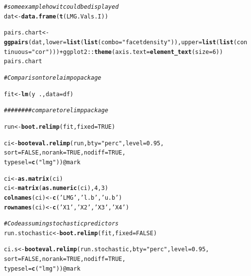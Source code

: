 \documentclass[11pt,a4paper,twoside]{book}\usepackage[]{graphicx}\usepackage[]{color}
\makeatletter
\newcommand{\hlnum}[1]{\textcolor[rgb]{0.686,0.059,0.569}{#1}}%
\newcommand{\hlstr}[1]{\textcolor[rgb]{0.192,0.494,0.8}{#1}}%
\newcommand{\hlcom}[1]{\textcolor[rgb]{0.678,0.584,0.686}{\textit{#1}}}%
\newcommand{\hlopt}[1]{\textcolor[rgb]{0,0,0}{#1}}%
\newcommand{\hlstd}[1]{\textcolor[rgb]{0.345,0.345,0.345}{#1}}%
\newcommand{\hlkwb}[1]{\textcolor[rgb]{0.69,0.353,0.396}{#1}}%
\newcommand{\hlkwc}[1]{\textcolor[rgb]{0.333,0.667,0.333}{#1}}%
\newcommand{\hlkwd}[1]{\textcolor[rgb]{0.737,0.353,0.396}{\textbf{#1}}}%
\newenvironment{kframe}{%
 \def\at@end@of@kframe{}%
 \ifinner\ifhmode%
  \def\at@end@of@kframe{\end{minipage}}%
  \begin{minipage}{\columnwidth}%
 \fi\fi%
 \def\FrameCommand##1{\hskip\@totalleftmargin \hskip-\fboxsep
 \colorbox{shadecolor}{##1}\hskip-\fboxsep
     \hskip-\linewidth \hskip-\@totalleftmargin \hskip\columnwidth}%
 \MakeFramed {\advance\hsize-\width
   \@totalleftmargin\z@ \linewidth\hsize
   \@setminipage}}%
 {\par\unskip\endMakeFramed%
 \at@end@of@kframe}
\newenvironment{knitrout}{}{} %
\makeatother
\begin{document}
\begin{knitrout}
\begin{kframe}
\begin{alltt}
\hlcom{# some example how it could be displayed}
\hlstd{dat} \hlkwb{<-} \hlkwd{data.frame}\hlstd{(}\hlkwd{t}\hlstd{(LMG.Vals.I))}

\hlstd{pairs.chart} \hlkwb{<-} \hlkwd{ggpairs}\hlstd{(dat,} \hlkwc{lower} \hlstd{=} \hlkwd{list}\hlstd{(}\hlkwd{list}\hlstd{(}\hlkwc{combo} \hlstd{=} \hlstr{"facetdensity"}\hlstd{)),} \hlkwc{upper} \hlstd{=} \hlkwd{list}\hlstd{(}\hlkwd{list}\hlstd{(}\hlkwc{continuous} \hlstd{=} \hlstr{"cor"}\hlstd{)))} \hlopt{+} \hlstd{ggplot2}\hlopt{::}\hlkwd{theme}\hlstd{(}\hlkwc{axis.text} \hlstd{=} \hlkwd{element_text}\hlstd{(}\hlkwc{size} \hlstd{=} \hlnum{6}\hlstd{))}
\hlstd{pairs.chart}



\hlcom{# Comparison to relaimpo package}

\hlstd{fit} \hlkwb{<-} \hlkwd{lm}\hlstd{(y}\hlopt{~}\hlstd{.,} \hlkwc{data}\hlstd{=df)}

\hlcom{######## compare to relimp package}

\hlstd{run}\hlkwb{<-}\hlkwd{boot.relimp}\hlstd{(fit,} \hlkwc{fixed}\hlstd{=}\hlnum{TRUE}\hlstd{)}

\hlstd{ci} \hlkwb{<-} \hlkwd{booteval.relimp}\hlstd{(run,} \hlkwc{bty} \hlstd{=} \hlstr{"perc"}\hlstd{,} \hlkwc{level} \hlstd{=} \hlnum{0.95}\hlstd{,}
                \hlkwc{sort} \hlstd{=} \hlnum{FALSE}\hlstd{,} \hlkwc{norank} \hlstd{=} \hlnum{TRUE}\hlstd{,} \hlkwc{nodiff} \hlstd{=} \hlnum{TRUE}\hlstd{,}
                \hlkwc{typesel} \hlstd{=} \hlkwd{c}\hlstd{(}\hlstr{"lmg"}\hlstd{))}\hlopt{@}\hlkwc{mark}

\hlstd{ci} \hlkwb{<-} \hlkwd{as.matrix}\hlstd{(ci)}
\hlstd{ci} \hlkwb{<-} \hlkwd{matrix}\hlstd{(}\hlkwd{as.numeric}\hlstd{(ci),} \hlnum{4} \hlstd{,} \hlnum{3}\hlstd{)}
\hlkwd{colnames}\hlstd{(ci)} \hlkwb{<-} \hlkwd{c}\hlstd{(}\hlstr{'LMG'}\hlstd{,} \hlstr{'l.b'}\hlstd{,} \hlstr{'u.b'}\hlstd{)}
\hlkwd{rownames}\hlstd{(ci)} \hlkwb{<-} \hlkwd{c}\hlstd{(}\hlstr{'X1'}\hlstd{,} \hlstr{'X2'}\hlstd{,} \hlstr{'X3'}\hlstd{,} \hlstr{'X4'}\hlstd{)}

\hlcom{#Code assuming stochastic predictors}
\hlstd{run.stochastic}\hlkwb{<-}\hlkwd{boot.relimp}\hlstd{(fit,} \hlkwc{fixed}\hlstd{=}\hlnum{FALSE}\hlstd{)}

\hlstd{ci.s} \hlkwb{<-} \hlkwd{booteval.relimp}\hlstd{(run.stochastic,} \hlkwc{bty} \hlstd{=} \hlstr{"perc"}\hlstd{,} \hlkwc{level} \hlstd{=} \hlnum{0.95}\hlstd{,}
                \hlkwc{sort} \hlstd{=} \hlnum{FALSE}\hlstd{,} \hlkwc{norank} \hlstd{=} \hlnum{TRUE}\hlstd{,} \hlkwc{nodiff} \hlstd{=} \hlnum{TRUE}\hlstd{,}
                \hlkwc{typesel} \hlstd{=} \hlkwd{c}\hlstd{(}\hlstr{"lmg"}\hlstd{))}\hlopt{@}\hlkwc{mark}


\end{alltt}
\end{kframe}
\end{knitrout}
\end{document}
